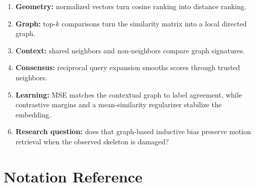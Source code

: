\documentclass[11pt,oneside,openany]{book}
\theoremstyle{myplain}
\theoremstyle{definition}
\begin{document}
\begin{conceptbox}[title=One sentence per layer]
\begin{enumerate}[leftmargin=*,itemsep=3pt]
  \item \textbf{Geometry:} normalized vectors turn cosine ranking into distance ranking.
  \item \textbf{Graph:} top-$k$ comparisons turn the similarity matrix into a local directed graph.
  \item \textbf{Context:} shared neighbors and non-neighbors compare graph signatures.
  \item \textbf{Consensus:} reciprocal query expansion smooths scores through trusted neighbors.
  \item \textbf{Learning:} MSE matches the contextual graph to label agreement, while contrastive margins and a mean-similarity regularizer stabilize the embedding.
  \item \textbf{Research question:} does that graph-based inductive bias preserve motion retrieval when the observed skeleton is damaged?
\end{enumerate}
\end{conceptbox}

\appendix
\chapter{Notation Reference}
\end{document}
